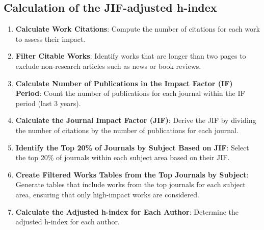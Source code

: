 \subsection{Calculation of the JIF-adjusted h-index}
\begin{enumerate}
      \item \textbf{Calculate Work Citations}: Compute the number of citations for each work to assess their impact.

      \item \textbf{Filter Citable Works}: Identify works that are longer than two pages to exclude non-research articles such as news or book reviews.

      \item \textbf{Calculate Number of Publications in the Impact Factor (IF) Period}: Count the number of publications
            for each journal within the IF period (last 3 years).

      \item \textbf{Calculate the Journal Impact Factor (JIF)}: Derive the JIF by dividing the number of citations by
            the number of publications for each journal.

      \item \textbf{Identify the Top 20\% of Journals by Subject Based on JIF}: Select the top 20\% of journals within
            each subject area based on their JIF\@.

      \item \textbf{Create Filtered Works Tables from the Top Journals by Subject}: Generate tables that include works from
            the top journals for each subject area, ensuring that only high-impact works are considered.


      \item \textbf{Calculate the Adjusted h-index for Each Author}: Determine the adjusted h-index for each author.
\end{enumerate}

